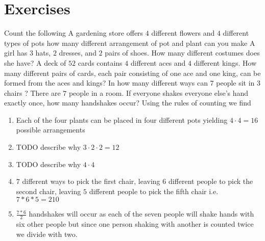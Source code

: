\section{Exercises}
\begin{ExerciseList}

\Exercise Count the following
\Question A gardening store offers $4 $ different flowers and $4$ different types of pots how many different arrangement of pot and plant can you make
\Question A girl has $3$ hats, $2$ dresses, and $2$ pairs of shoes. How many different costumes does she have?
\Question A deck of $52$ cards contains $4$ different aces and $4$ different kings. How many different pairs of cards, each pair consisting of one ace and one king, can be formed from the aces and kings?
\Question In how many different ways can $7$ people sit in $3$ chairs ?
\Question There are $7$ people in a room. If everyone shakes everyone else's hand exactly once, how many handshakes occur?
\Answer Using the rules of counting we find
\begin{enumerate}
\item \myindent Each of the four plants can be placed in four different pots yielding $4 \cdot 4 = 16$ possible arrangements
\item \myindent TODO describe why $3 \cdot 2 \cdot 2 = 12$
\item \myindent TODO describe why $4 \cdot 4$
\item \myindent $7$ different ways to pick the first chair, leaving $6$ different people to pick the second chair, leaving $5$ different people to pick the fifth chair i.e. $7*6*5 = 210$
\item \myindent $\frac{7*6}{2}$ handshakes will occur as each of the seven people will shake hands with six other people but since one person shaking with another is counted twice we divide with two.
\end{enumerate}

\end{ExerciseList}
